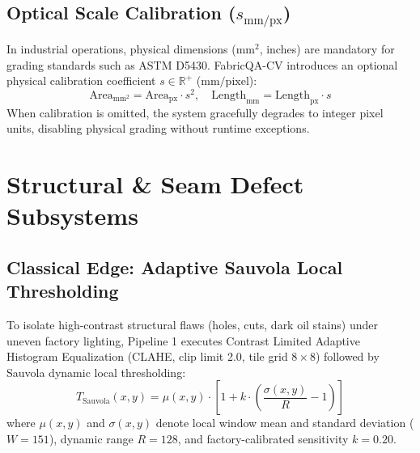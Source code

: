 \documentclass[10pt,a4paper]{article}
\begin{document}
\subsection{Optical Scale Calibration ($s_{\text{mm/px}}$)}
In industrial operations, physical dimensions ($\text{mm}^2$, inches) are mandatory for grading standards such as ASTM D5430. FabricQA-CV introduces an optional physical calibration coefficient $s \in \mathbb{R}^+$ ($\text{mm}/\text{pixel}$):
\begin{equation}
\text{Area}_{\text{mm}^2} = \text{Area}_{\text{px}} \cdot s^2, \quad \text{Length}_{\text{mm}} = \text{Length}_{\text{px}} \cdot s
\end{equation}
When calibration is omitted, the system gracefully degrades to integer pixel units, disabling physical grading without runtime exceptions.

\section{Structural \& Seam Defect Subsystems}

\subsection{Classical Edge: Adaptive Sauvola Local Thresholding}
To isolate high-contrast structural flaws (holes, cuts, dark oil stains) under uneven factory lighting, Pipeline 1 executes Contrast Limited Adaptive Histogram Equalization (CLAHE, clip limit 2.0, tile grid $8\times 8$) followed by Sauvola dynamic local thresholding:
\begin{equation}
T_{\text{Sauvola}}(x, y) = \mu(x, y) \cdot \left[ 1 + k \cdot \left( \frac{\sigma(x, y)}{R} - 1 \right) \right]
\end{equation}
where $\mu(x, y)$ and $\sigma(x, y)$ denote local window mean and standard deviation ($W = 151$), dynamic range $R = 128$, and factory-calibrated sensitivity $k = 0.20$.
\end{document}
